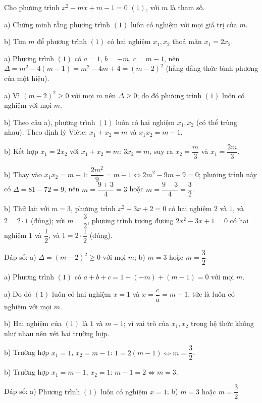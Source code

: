\begin{problem}[9DS-PT2-008]
Cho phương trình $x^2 - mx + m - 1 = 0$ $(1)$, với $m$ là tham số.

a) Chứng minh rằng phương trình $(1)$ luôn có nghiệm với mọi giá trị của $m$.

b) Tìm $m$ để phương trình $(1)$ có hai nghiệm $x_1, x_2$ thoả mãn $x_1 = 2x_2$.

\begin{solution}
a) Phương trình $(1)$ có $a = 1$, $b = -m$, $c = m - 1$, nên $\Delta = m^2 - 4(m - 1) = m^2 - 4m + 4 = (m - 2)^2$ (hằng đẳng thức bình phương của một hiệu).

a) Vì $(m - 2)^2 \geq 0$ với mọi $m$ nên $\Delta \geq 0$; do đó phương trình $(1)$ luôn có nghiệm với mọi $m$.

b) Theo câu a), phương trình $(1)$ luôn có hai nghiệm $x_1, x_2$ (có thể trùng nhau). Theo định lý Viète: $x_1 + x_2 = m$ và $x_1 x_2 = m - 1$.

b) Kết hợp $x_1 = 2x_2$ với $x_1 + x_2 = m$: $3x_2 = m$, suy ra $x_2 = \dfrac{m}{3}$ và $x_1 = \dfrac{2m}{3}$.

b) Thay vào $x_1 x_2 = m - 1$: $\dfrac{2m^2}{9} = m - 1 \Leftrightarrow 2m^2 - 9m + 9 = 0$; phương trình này có $\Delta = 81 - 72 = 9$, nên $m = \dfrac{9 + 3}{4} = 3$ hoặc $m = \dfrac{9 - 3}{4} = \dfrac{3}{2}$.

b) Thử lại: với $m = 3$, phương trình $x^2 - 3x + 2 = 0$ có hai nghiệm $2$ và $1$, và $2 = 2 \cdot 1$ (đúng); với $m = \dfrac{3}{2}$, phương trình tương đương $2x^2 - 3x + 1 = 0$ có hai nghiệm $1$ và $\dfrac{1}{2}$, và $1 = 2 \cdot \dfrac{1}{2}$ (đúng).

Đáp số: a) $\boxed{\Delta = (m - 2)^2 \geq 0 \text{ với mọi } m}$; b) $\boxed{m = 3 \text{ hoặc } m = \dfrac{3}{2}}$
\end{solution}

\begin{solution}
a) Phương trình $(1)$ có $a + b + c = 1 + (-m) + (m - 1) = 0$ với mọi $m$.

a) Do đó $(1)$ luôn có hai nghiệm $x = 1$ và $x = \dfrac{c}{a} = m - 1$, tức là luôn có nghiệm với mọi $m$.

b) Hai nghiệm của $(1)$ là $1$ và $m - 1$; vì vai trò của $x_1, x_2$ trong hệ thức không như nhau nên xét hai trường hợp.

b) Trường hợp $x_1 = 1$, $x_2 = m - 1$: $1 = 2(m - 1) \Leftrightarrow m = \dfrac{3}{2}$.

b) Trường hợp $x_1 = m - 1$, $x_2 = 1$: $m - 1 = 2 \Leftrightarrow m = 3$.

Đáp số: a) $\boxed{\text{Phương trình } (1) \text{ luôn có nghiệm } x = 1}$; b) $\boxed{m = 3 \text{ hoặc } m = \dfrac{3}{2}}$
\end{solution}
\end{problem}


